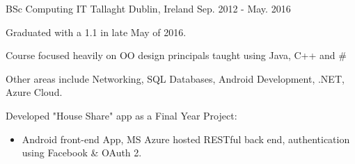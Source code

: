

\begin{cventries}

  \cventry
    {BSc Computing} %
    {IT Tallaght} %
    {Dublin, Ireland} %
    {Sep. 2012 - May. 2016} %
    {
      \begin{cvitems} %
        \item {Graduated with a 1.1 in late May of 2016.}
        \item {Course focused heavily on OO design principals taught using Java, C++ and \#}
        \item {Other areas include Networking, SQL Databases, Android Development, .NET, Azure Cloud.}
        \item {Developed "House Share" app as a Final Year Project:
        \begin{itemize}
        \item Android front-end App, MS Azure hosted RESTful back end, authentication using Facebook \& OAuth 2.
        \end{itemize} 
}
      \end{cvitems}
    }

\end{cventries}
